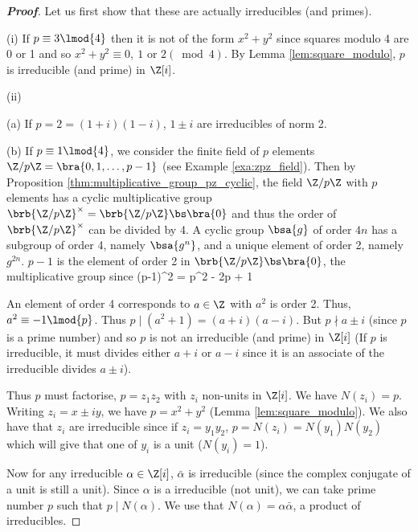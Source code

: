 \begin{proof}[\bf Proof]
Let us first show that these are actually irreducibles (and primes).
\ben
\item [(i)] If $p \equiv 3 \lmod{4}$ then it is not of the form $x^2 + y^2$ since squares modulo 4 are 0 or 1 and so $x^2 + y^2 \equiv 0,\ 1 \text{ or }2 (\bmod 4)$. By Lemma \ref{lem:square_modulo}, $p$ is irreducible (and prime) in $\Z[i]$.

\item [(ii)] \ben
\item [(a)] If $p = 2 = (1 + i)(1 - i)$, %
$1 \pm  i$ are irreducibles of norm 2.

\item [(b)] If $p \equiv 1 \lmod{4}$, we consider the finite field of $p$ elements $\Z/p\Z = \bra{0, 1,\dots , p - 1}$ (see Example \ref{exa:zpz_field}). Then by Proposition \ref{thm:multiplicative_group_pz_cyclic}, the field $\Z/p\Z$ with $p$ elements has a cyclic multiplicative group $\brb{\Z/p\Z}^{\times} = \brb{\Z/p\Z}\bs\bra{0}$ and thus the order of $\brb{\Z/p\Z}^{\times}$ can be divided by 4. A cyclic group $\bsa{g}$ of order $4n$ has a subgroup of order 4, namely $\bsa{ g^n }$, and a unique element of order 2, namely $g^{2n}$. $p - 1$ is the element of order 2 in $\brb{\Z/p\Z} \bs\bra{0}$, the multiplicative group since %
\be
(p-1)^2 = p^2 - 2p + 1  
\ee

An element of order 4 corresponds to $a \in \Z$ with $a^2$ is order 2. Thus, $a^2 \equiv -1 \lmod{p}$. Thus $p \mid (a^2 + 1) = (a + i)(a - i)$. %
But $p \nmid a \pm  i$ (since $p$ is a prime number) and so $p$ is not an irreducible (and prime) in $\Z[i]$ (If $p$ is irreducible, it must divides either $a+ i$ or $a-i$ since it is an associate of the irreducible divides $a\pm i$).

Thus $p$ must factorise, $p = z_1z_2$ with $z_i$ non-units in $\Z[i]$. We have $N(z_i) = p$. Writing $z_i = x \pm  iy$, we have $p = x^2 + y^2$ (Lemma \ref{lem:square_modulo}). We also have that $z_i$ are irreducible since if $z_i = y_1y_2$, $p = N(z_i) = N(y_1)N(y_2)$ which will give that one of $y_i$ is a unit ($N(y_i) = 1$).
\een
\een

Now for any irreducible $\alpha \in\Z[i]$, $\bar{\alpha}$ is irreducible (since the complex conjugate of a unit is still a unit). Since $\alpha$ is a irreducible (not unit), we can take prime number $p$ such that $p \mid N(\alpha)$. We use that $N(\alpha) = \alpha\bar{\alpha}$, a product of irreducibles.


\end{proof}
